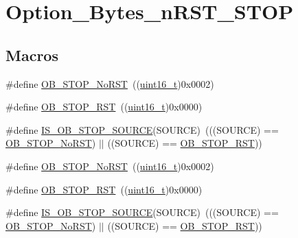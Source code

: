 \hypertarget{group___option___bytes__n_r_s_t___s_t_o_p}{}\section{Option\+\_\+\+Bytes\+\_\+n\+R\+S\+T\+\_\+\+S\+T\+OP}
\label{group___option___bytes__n_r_s_t___s_t_o_p}
\subsection*{Macros}
\begin{DoxyCompactItemize}
\item 
\#define \hyperlink{group___option___bytes__n_r_s_t___s_t_o_p_ga6762d6e4045fec58b49dfc03c1927d51}{O\+B\+\_\+\+S\+T\+O\+P\+\_\+\+No\+R\+ST}~((\hyperlink{_p_e___types_8h_a1f1825b69244eb3ad2c7165ddc99c956}{uint16\+\_\+t})0x0002)
\item 
\#define \hyperlink{group___option___bytes__n_r_s_t___s_t_o_p_gaef92c03b1f279c532bfa13d3bb074b57}{O\+B\+\_\+\+S\+T\+O\+P\+\_\+\+R\+ST}~((\hyperlink{_p_e___types_8h_a1f1825b69244eb3ad2c7165ddc99c956}{uint16\+\_\+t})0x0000)
\item 
\#define \hyperlink{group___option___bytes__n_r_s_t___s_t_o_p_ga131ae3434f300c8317dd6b3b349c7cab}{I\+S\+\_\+\+O\+B\+\_\+\+S\+T\+O\+P\+\_\+\+S\+O\+U\+R\+CE}(S\+O\+U\+R\+CE)~(((S\+O\+U\+R\+CE) == \hyperlink{group___option___bytes__n_r_s_t___s_t_o_p_ga6762d6e4045fec58b49dfc03c1927d51}{O\+B\+\_\+\+S\+T\+O\+P\+\_\+\+No\+R\+ST}) $\vert$$\vert$ ((S\+O\+U\+R\+CE) == \hyperlink{group___option___bytes__n_r_s_t___s_t_o_p_gaef92c03b1f279c532bfa13d3bb074b57}{O\+B\+\_\+\+S\+T\+O\+P\+\_\+\+R\+ST}))
\item 
\#define \hyperlink{group___option___bytes__n_r_s_t___s_t_o_p_ga6762d6e4045fec58b49dfc03c1927d51}{O\+B\+\_\+\+S\+T\+O\+P\+\_\+\+No\+R\+ST}~((\hyperlink{_p_e___types_8h_a1f1825b69244eb3ad2c7165ddc99c956}{uint16\+\_\+t})0x0002)
\item 
\#define \hyperlink{group___option___bytes__n_r_s_t___s_t_o_p_gaef92c03b1f279c532bfa13d3bb074b57}{O\+B\+\_\+\+S\+T\+O\+P\+\_\+\+R\+ST}~((\hyperlink{_p_e___types_8h_a1f1825b69244eb3ad2c7165ddc99c956}{uint16\+\_\+t})0x0000)
\item 
\#define \hyperlink{group___option___bytes__n_r_s_t___s_t_o_p_ga131ae3434f300c8317dd6b3b349c7cab}{I\+S\+\_\+\+O\+B\+\_\+\+S\+T\+O\+P\+\_\+\+S\+O\+U\+R\+CE}(S\+O\+U\+R\+CE)~(((S\+O\+U\+R\+CE) == \hyperlink{group___option___bytes__n_r_s_t___s_t_o_p_ga6762d6e4045fec58b49dfc03c1927d51}{O\+B\+\_\+\+S\+T\+O\+P\+\_\+\+No\+R\+ST}) $\vert$$\vert$ ((S\+O\+U\+R\+CE) == \hyperlink{group___option___bytes__n_r_s_t___s_t_o_p_gaef92c03b1f279c532bfa13d3bb074b57}{O\+B\+\_\+\+S\+T\+O\+P\+\_\+\+R\+ST}))
\end{DoxyCompactItemize}


